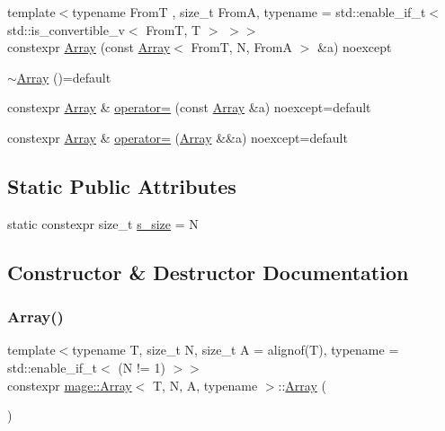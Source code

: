 \begin{DoxyCompactItemize}
\item 
{\footnotesize template$<$typename FromT , size\+\_\+t FromA, typename  = std\+::enable\+\_\+if\+\_\+t$<$ std\+::is\+\_\+convertible\+\_\+v$<$ From\+T, T $>$ $>$$>$ }\\constexpr \mbox{\hyperlink{structmage_1_1_array_a950b26208c3546704f42e92c312a93ed}{Array}} (const \mbox{\hyperlink{structmage_1_1_array}{Array}}$<$ FromT, N, FromA $>$ \&a) noexcept
\item 
\mbox{\hyperlink{structmage_1_1_array_a7adc09166915789b93a7a3af118182e0}{$\sim$\+Array}} ()=default
\item 
constexpr \mbox{\hyperlink{structmage_1_1_array}{Array}} \& \mbox{\hyperlink{structmage_1_1_array_a693f811869bcaae12b5308981682affa}{operator=}} (const \mbox{\hyperlink{structmage_1_1_array}{Array}} \&a) noexcept=default
\item 
constexpr \mbox{\hyperlink{structmage_1_1_array}{Array}} \& \mbox{\hyperlink{structmage_1_1_array_ae90a7beb10b5edc39331e465af0d1acc}{operator=}} (\mbox{\hyperlink{structmage_1_1_array}{Array}} \&\&a) noexcept=default
\end{DoxyCompactItemize}
\subsection*{Static Public Attributes}
\begin{DoxyCompactItemize}
\item 
static constexpr size\+\_\+t \mbox{\hyperlink{structmage_1_1_array_aead6104ec6173aed5755a261b0a82b82}{s\+\_\+size}} = N
\end{DoxyCompactItemize}


\subsection{Constructor \& Destructor Documentation}
\mbox{\label{structmage_1_1_array_ac1cf5733c005dfb79fb9e5e736098598}} 
\subsubsection{\texorpdfstring{Array()}{Array()}\hspace{0.1cm}{\footnotesize\ttfamily [1/10]}}
{\footnotesize\ttfamily template$<$typename T, size\+\_\+t N, size\+\_\+t A = alignof(\+T), typename  = std\+::enable\+\_\+if\+\_\+t$<$ (\+N != 1) $>$$>$ \\
constexpr \mbox{\hyperlink{structmage_1_1_array}{mage\+::\+Array}}$<$ T, N, A, typename $>$\+::\mbox{\hyperlink{structmage_1_1_array}{Array}} (\begin{DoxyParamCaption}{ }\end{DoxyParamCaption})\hspace{0.3cm}{\ttfamily [noexcept]}}

